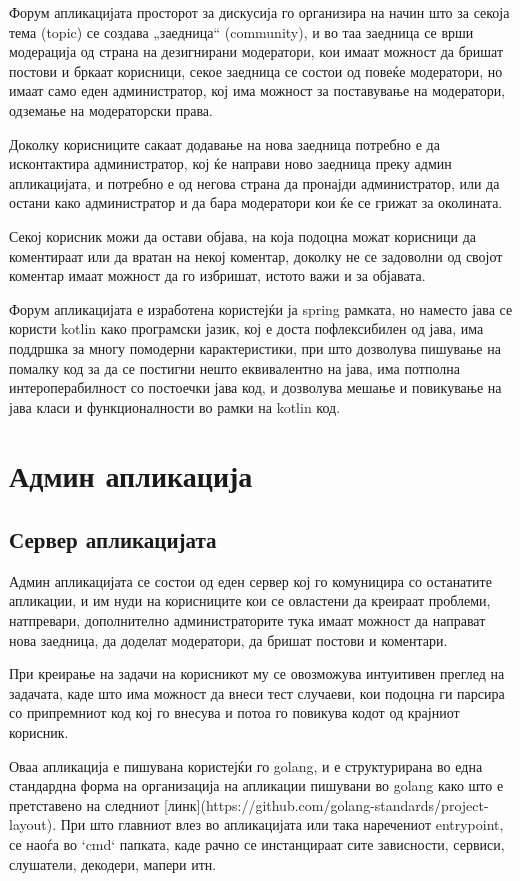 \documentclass{article}
\begin{document}
Форум апликацијата просторот за дискусија го организира на начин што за секоја тема (topic) се создава „заедница“ (community), и во таа заедница се врши модерација од страна на дезигнирани модератори, кои имаат можност да бришат постови и бркаат корисници, секое заедница се состои од повеќе модератори, но имаат само еден администратор, кој има можност за поставување на модератори, одземање на модераторски права.

Доколку корисниците сакаат додавање на нова заедница потребно е да исконтактира администратор, кој ќе направи ново заедница преку админ апликацијата, и потребно е од негова страна да пронајди администратор, или да остани како администратор и да бара модератори кои ќе се грижат за околината.

Секој корисник можи да остави објава, на која подоцна можат корисници да коментираат или да вратан на некој коментар, доколку не се задоволни од својот коментар имаат можност да го избришат, истото важи и за објавата.

Форум апликацијата е изработена користејќи ја spring рамката, но наместо јава се користи kotlin како програмски јазик, кој е доста пофлексибилен од јава, има поддршка за многу помодерни карактеристики, при што дозволува пишување на помалку код за да се постигни нешто еквивалентно на јава, има потполна интероперабилност со постоечки јава код, и дозволува мешање и повикување на јава класи и функционалности во рамки на kotlin код.

\section{Админ апликација}

\subsection{Сервер апликацијата}

Админ апликацијата се состои од еден сервер кој го комуницира со останатите апликации, и им нуди на корисниците кои се овластени да креираат проблеми, натпревари, дополнително администраторите тука имаат можност да направат нова заедница, да доделат модератори, да бришат постови и коментари.

При креирање на задачи на корисникот му се овозможува интуитивен преглед на задачата, каде што има можност да внеси тест случаеви, кои подоцна ги парсира со припремниот код кој го внесува и потоа го повикува кодот од крајниот корисник.

Оваа апликација е пишувана користејќи го golang, и е структурирана во една стандардна форма на организација на апликации пишувани во golang како што е претставено на следниот [линк](https://github.com/golang-standards/project-layout). При што главниот влез во апликацијата или така наречениот entrypoint, се наоѓа во `cmd` папката, каде рачно се инстанцираат сите зависности, сервиси, слушатели, декодери,  мапери итн.
\end{document}
